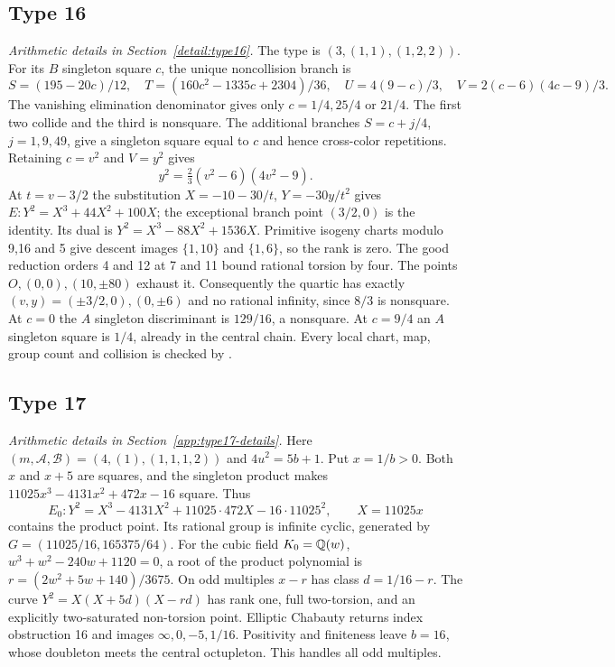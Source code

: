 \subsection{Type 16}\label{app:type16}
\noindent\emph{Arithmetic details in Section~\ref{detail:type16}.}\enspace
The type is $(3,(1,1),(1,2,2))$. For its $B$ singleton square $c$,
the unique noncollision branch is
\[
 S=(195-20c)/12,\quad T=(160c^2-1335c+2304)/36,
 \quad U=4(9-c)/3,\quad V=2(c-6)(4c-9)/3.
\]
The vanishing elimination denominator gives only $c=1/4,25/4$
or $21/4$. The first two collide and the third is nonsquare.
The additional branches $S=c+j/4$, $j=1,9,49$, give a singleton
square equal to $c$ and hence cross-color repetitions.
Retaining $c=v^2$ and $V=y^2$ gives
\[
 y^2=\tfrac23(v^2-6)(4v^2-9).
\]
At $t=v-3/2$ the substitution $X=-10-30/t$, $Y=-30y/t^2$
gives $E:Y^2=X^3+44X^2+100X$; the exceptional branch point
$(3/2,0)$ is the identity. Its dual is $Y^2=X^3-88X^2+1536X$.
Primitive isogeny charts modulo 9,16 and 5 give descent images
$\{1,10\}$ and $\{1,6\}$, so the rank is zero. The good
reduction orders 4 and 12 at 7 and 11 bound rational torsion by
four. The points $O,(0,0),(10,\pm80)$ exhaust it. Consequently
the quartic has exactly $(v,y)=(\pm3/2,0),(0,\pm6)$ and no
rational infinity, since $8/3$ is nonsquare. At $c=0$ the
$A$ singleton discriminant is $129/16$, a nonsquare. At $c=9/4$
an $A$ singleton square is $1/4$, already in the central chain.
Every local chart, map, group count and collision is checked by
.

\subsection{Type 17}\label{app:type17}
\noindent\emph{Arithmetic details in Section~\ref{app:type17-details}.}\enspace
Here $(m,\mathcal A,\mathcal B)=(4,(1),(1,1,1,2))$ and
$4u^2=5b+1$. Put $x=1/b>0$. Both $x$ and $x+5$ are squares,
and the singleton product makes
$11025x^3-4131x^2+472x-16$ square. Thus
\[
 E_0:Y^2=X^3-4131X^2+11025\cdot472X-16\cdot11025^2,
 \qquad X=11025x
\]
contains the product point. Its rational group is infinite cyclic,
generated by $G=(11025/16,165375/64)$.
For the cubic field $K_0=\mathbb Q(w)$,
$w^3+w^2-240w+1120=0$, a root of the product polynomial is
$r=(2w^2+5w+140)/3675$. On odd multiples $x-r$ has class
$d=1/16-r$. The curve $Y^2=X(X+5d)(X-rd)$ has rank one,
full two-torsion, and an explicitly two-saturated non-torsion point.
Elliptic Chabauty returns index obstruction 16 and images
$\infty,0,-5,1/16$. Positivity and finiteness leave $b=16$,
whose doubleton meets the central octupleton. This handles all
odd multiples.

